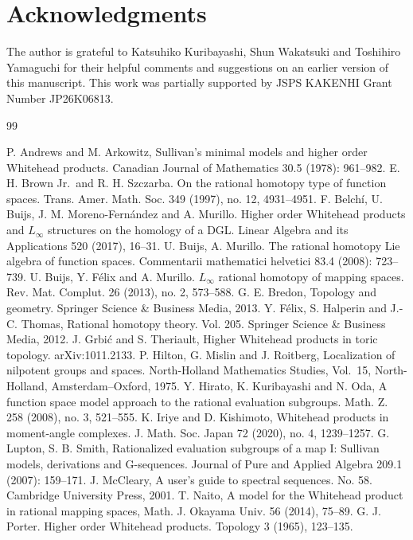 \documentclass[a4paper,10pt]{amsart}
\theoremstyle{definition}
\theoremstyle{remark}
\numberwithin{equation}{section}
\begin{document}
\section*{Acknowledgments}

The author is grateful to Katsuhiko Kuribayashi, Shun Wakatsuki and Toshihiro Yamaguchi for their helpful comments and suggestions on an earlier version of this manuscript.
This work was partially supported by JSPS KAKENHI Grant Number JP26K06813.



\begin{thebibliography}{99}


P. Andrews and M. Arkowitz, Sullivan's minimal models and higher order Whitehead products. Canadian Journal of Mathematics 30.5 (1978): 961--982.
E. H. Brown Jr.\ and R. H. Szczarba.
On the rational homotopy type of function spaces.
Trans. Amer. Math. Soc. 349 (1997), no. 12, 4931--4951.
F. Belch{\'i}, U. Buijs, J. M. Moreno-Fern{\'a}ndez and A. Murillo.
Higher order Whitehead products and $L_\infty$ structures on the homology of a DGL.
Linear Algebra and its Applications 520 (2017), 16--31.
U. Buijs, A. Murillo. The rational homotopy Lie algebra of function spaces. Commentarii mathematici helvetici 83.4 (2008): 723--739.
U. Buijs, Y. F{\'e}lix and A. Murillo.
$L_{\infty}$ rational homotopy of mapping spaces.
Rev. Mat. Complut. 26 (2013), no. 2, 573--588.
G. E. Bredon, Topology and geometry. Springer Science \& Business Media, 2013.
Y. F\'{e}lix,  S. Halperin and J.-C. Thomas, Rational homotopy theory. Vol. 205. Springer Science \& Business Media, 2012.
J. Grbi{\'c} and S. Theriault,
Higher Whitehead products in toric topology.
arXiv:1011.2133.
P. Hilton, G. Mislin and J. Roitberg,
Localization of nilpotent groups and spaces.
North-Holland Mathematics Studies, Vol.~15,
North-Holland, Amsterdam--Oxford, 1975.
Y. Hirato, K. Kuribayashi and N. Oda,
A function space model approach to the rational evaluation subgroups.
Math. Z. 258 (2008), no. 3, 521--555.
K. Iriye and D. Kishimoto,
Whitehead products in moment-angle complexes.
J. Math. Soc. Japan 72 (2020), no. 4, 1239--1257.
G. Lupton, S. B. Smith, Rationalized evaluation subgroups of a map I: Sullivan models, derivations and G-sequences. Journal of Pure and Applied Algebra 209.1 (2007): 159--171.
J. McCleary, A user's guide to spectral sequences. No. 58. Cambridge University Press, 2001.
T. Naito, A model for the Whitehead product in rational mapping spaces, Math. J. Okayama Univ. 56 (2014), 75--89.
G. J. Porter.
Higher order Whitehead products.
Topology 3 (1965), 123--135.



\end{thebibliography}



 
\end{document}
